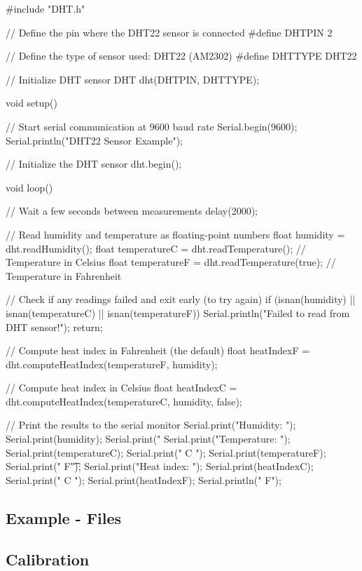 \begin{Arduino}
	#include "DHT.h"
	
	// Define the pin where the DHT22 sensor is connected
	#define DHTPIN 2
	
	// Define the type of sensor used: DHT22 (AM2302)
	#define DHTTYPE DHT22
	
	// Initialize DHT sensor
	DHT dht(DHTPIN, DHTTYPE);
	
	void setup() {
		// Start serial communication at 9600 baud rate
		Serial.begin(9600);
		Serial.println("DHT22 Sensor Example");
		
		// Initialize the DHT sensor
		dht.begin();
	}
	
	void loop() {
		// Wait a few seconds between measurements
		delay(2000);
		
		// Read humidity and temperature as floating-point numbers
		float humidity = dht.readHumidity();
		float temperatureC = dht.readTemperature(); // Temperature in Celsius
		float temperatureF = dht.readTemperature(true); // Temperature in Fahrenheit
		
		// Check if any readings failed and exit early (to try again)
		if (isnan(humidity) || isnan(temperatureC) || isnan(temperatureF)) {
			Serial.println("Failed to read from DHT sensor!");
			return;
		}
		
		// Compute heat index in Fahrenheit (the default)
		float heatIndexF = dht.computeHeatIndex(temperatureF, humidity);
		
		// Compute heat index in Celsius
		float heatIndexC = dht.computeHeatIndex(temperatureC, humidity, false);
		
		// Print the results to the serial monitor
		Serial.print("Humidity: ");
		Serial.print(humidity);
		Serial.print(" %
		Serial.print("Temperature: ");
		Serial.print(temperatureC);
		Serial.print(" C ");
		Serial.print(temperatureF);
		Serial.print(" F\t");
		Serial.print("Heat index: ");
		Serial.print(heatIndexC);
		Serial.print(" C ");
		Serial.print(heatIndexF);
		Serial.println(" F");
	}
	
	
\end{Arduino}



\subsection{Example - Files}



\subsection{Calibration}

